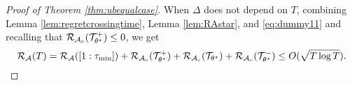 \begin{proof}[Proof of Theorem \ref{thm:ubequalcase}]
When  $\Delta$ does not depend on $T$, combining  Lemma \ref{lem:regretcrossingtime},  Lemma \ref{lem:RAstar}, and \eqref{eq:dummy11} and recalling that  $\mathcal{R}_{\mathcal{A}_c}(\mathcal{T}^+_{\theta^\star})\le 0$, we get 
$$\mathcal{R}_{\mathcal{A}}(T) = \mathcal{R}_{\mathcal{A}}([1:\tau_{\min}]) + \mathcal{R}_{\mathcal{A}_c}(\mathcal{T}^+_{\theta^\star}) + \mathcal{R}_{\mathcal{A}_c}( \mathcal{T}_{\theta^\star})+  \mathcal{R}_{\mathcal{A}_c}(\mathcal{T}^{-}_{\theta^\star}) \le O(\sqrt{T \log T}).$$ 


%
%
% 
%


\end{proof}
